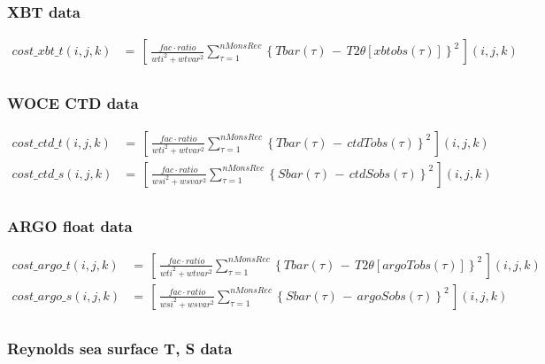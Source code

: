 \subsubsection{XBT data}

\begin{equation}
\begin{aligned}
cost\_xbt\_t(i,j,k) & = \,
\left[ \, \frac{fac \cdot ratio}{wti^2 + wtvar^2} \sum_{\tau=1}^{nMonsRec}
\left\{ Tbar(\tau) \, - \, T2\theta[xbtobs(\tau)] \right\}^2 \, \right](i,j,k)
 \\
\end{aligned}
\end{equation}

\subsubsection{WOCE CTD data}

\begin{equation}
\begin{aligned}
cost\_ctd\_t(i,j,k) & = \,
\left[ \, \frac{fac \cdot ratio}{wti^2 + wtvar^2} \sum_{\tau=1}^{nMonsRec}
\left\{ Tbar(\tau) \, - \, ctdTobs(\tau) \right\}^2 \, \right](i,j,k)
 \\
cost\_ctd\_s(i,j,k) & = \,
\left[ \, \frac{fac \cdot ratio}{wsi^2 + wsvar^2} \sum_{\tau=1}^{nMonsRec}
\left\{ Sbar(\tau) \, - \, ctdSobs(\tau) \right\}^2 \, \right](i,j,k)
 \\
\end{aligned}
\end{equation}

\subsubsection{ARGO float data}

\begin{equation}
\begin{aligned}
cost\_argo\_t(i,j,k) & = \,
\left[ \, \frac{fac \cdot ratio}{wti^2 + wtvar^2} \sum_{\tau=1}^{nMonsRec}
\left\{ Tbar(\tau) \, - \, T2\theta[argoTobs(\tau)] \right\}^2 \, \right](i,j,k)
 \\
cost\_argo\_s(i,j,k) & = \,
\left[ \, \frac{fac \cdot ratio}{wsi^2 + wsvar^2} \sum_{\tau=1}^{nMonsRec}
\left\{ Sbar(\tau) \, - \, argoSobs(\tau) \right\}^2 \, \right](i,j,k)
 \\
\end{aligned}
\end{equation}

\subsubsection{Reynolds sea surface T, S data}

